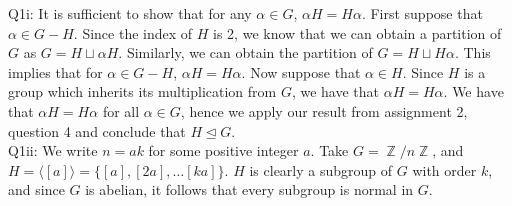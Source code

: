 \documentclass[letterpaper]{article}
\DeclareMathOperator{\Z}{\mathbb{Z}}
\newcommand{\lan}{\langle}
\newcommand{\ran}{\rangle}
\newcommand{\inn}[1]{\lan#1\ran}
\begin{document}
\noindent
Q1i: 
It is sufficient to show that for any $\alpha\in G$, $\alpha H = H \alpha$. First suppose that $\alpha \in G - H$. Since the index of $H$ is 2, we know that we can obtain a partition of $G$ as $G = H \sqcup \alpha H$. Similarly, we can obtain the partition of $G = H \sqcup H \alpha$. This implies that for $\alpha \in G - H$, $\alpha H = H \alpha$. Now suppose that $\alpha \in H$. Since $H$ is a group which inherits its multiplication from $G$, we have that $\alpha H = H \alpha$. We have that $\alpha H = H \alpha$ for all $\alpha\in G$, hence we apply our result from assignment 2, question 4 and conclude that $H \trianglelefteq G$.
\newline \\ \noindent 
Q1ii:  We write $n = ak$ for some positive integer $a$. Take $G = \Z / n\Z$, and $H = \inn{[a]} = \{[a], [2a], \dots [ka] \}$. $H$ is clearly a subgroup of $G$ with order $k$, and since $G$ is abelian, it follows that every subgroup is normal in $G$. 
\end{document}
